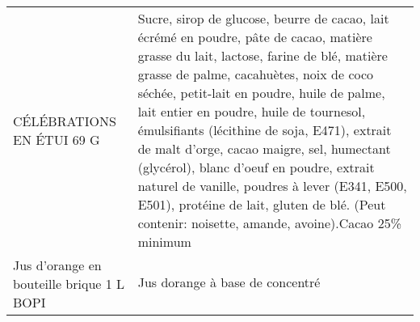 \begin{longtable}{p{5cm}p{10cm}}
                                                                                CÉLÉBRATIONS EN ÉTUI 69 G &                                                                                                                                                                                                                                                                                                                                                                                                                                                                 Sucre, sirop de glucose, beurre de cacao, lait écrémé en poudre, pâte de cacao, matière grasse du lait, lactose, farine de blé, matière grasse de palme, cacahuètes, noix de coco séchée, petit-lait en poudre, huile de palme, lait entier en poudre, huile de tournesol, émulsifiants (lécithine de soja, E471), extrait de malt d'orge, cacao maigre, sel, humectant (glycérol), blanc d'oeuf en poudre, extrait naturel de vanille, poudres à lever (E341, E500, E501), protéine de lait, gluten de blé. (Peut contenir: noisette, amande, avoine).Cacao 25\% minimum \\
                                                                Jus d'orange en bouteille brique 1 L BOPI &                                                                                                                                                                                                                                                                                                                                                                                                                                                                                                                                                                                                                                                                                                                                                                                                                                                                                                                                                                                                         Jus dorange à base de concentré \\

\end{longtable}
